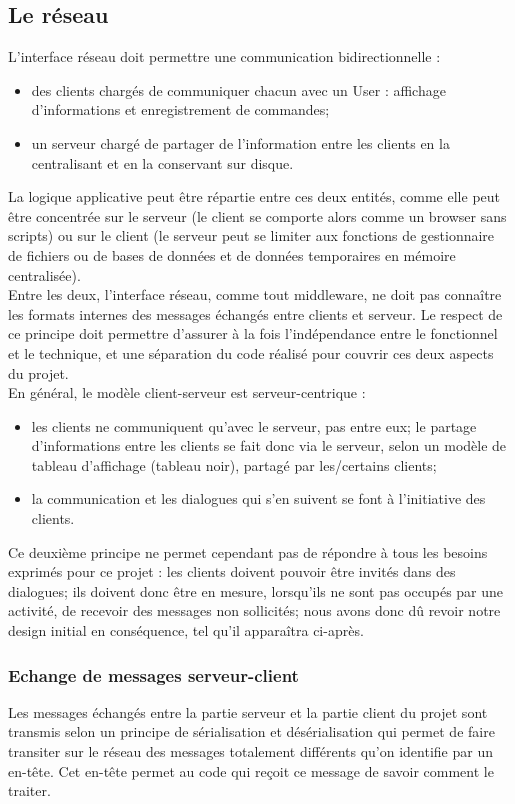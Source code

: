 \documentclass[a4paper,titlepage]{scrreprt}
\begin{document}
\subsection{Le réseau}
  L'interface réseau doit permettre une communication bidirectionnelle :
\begin{itemize}
  \item des clients chargés de communiquer chacun avec un User : affichage d'informations et enregistrement de commandes;
  \item un serveur chargé de partager de l'information entre les clients en la centralisant et en la conservant sur disque.
\end{itemize}
La logique applicative peut être répartie entre ces deux entités, comme elle peut être concentrée sur le serveur (le client se comporte alors comme un browser sans scripts) ou sur le client (le serveur peut se limiter aux fonctions de gestionnaire de fichiers ou de bases de données et de données temporaires en mémoire centralisée).\\
Entre les deux, l'interface réseau, comme tout middleware, ne doit pas connaître les formats internes des messages échangés entre clients et serveur. Le respect de ce principe doit permettre d'assurer à la fois l'indépendance entre le fonctionnel et le technique, et une séparation du code réalisé pour couvrir ces deux aspects du projet.\\
En général, le modèle client-serveur \cite{Bulfone} est serveur-centrique :
\begin{itemize}
  \item les clients ne communiquent qu'avec le serveur, pas entre eux; le partage d'informations entre les clients
  se fait donc via le serveur, selon un modèle de tableau d'affichage (tableau noir), partagé par les/certains clients;
  \item la communication et les dialogues qui s'en suivent se font à l'initiative des clients.
\end{itemize}
Ce deuxième principe ne permet cependant pas de répondre à tous les besoins exprimés pour ce projet :
les clients doivent pouvoir être invités dans des dialogues; ils doivent donc être en mesure,
lorsqu'ils ne sont pas occupés par une activité, de recevoir des messages non sollicités;
nous avons donc dû revoir notre design initial en conséquence, tel qu'il apparaîtra ci-après.\\

\subsubsection{Echange de messages serveur-client}
Les messages échangés entre la partie serveur et la partie client du projet sont transmis selon un principe de sérialisation et désérialisation qui permet de faire transiter sur le réseau des messages totalement différents qu'on identifie par un en-tête. Cet en-tête permet au code qui reçoit ce message de savoir comment le traiter.
\end{document}
